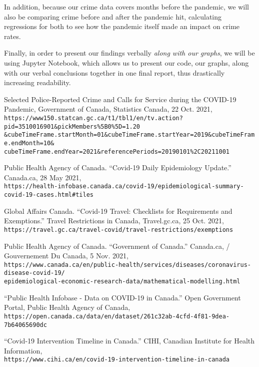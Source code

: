 \documentclass[fontsize=11pt]{article}
\newcommand{\quotes}[1]{``#1''}
\begin{document}
In addition, because our crime data covers months before the pandemic, we will also be comparing crime before and after the pandemic hit, calculating regressions for both to see how the pandemic itself made an impact on crime rates.

Finally, in order to present our findings verbally \emph{along with our graphs}, we will be using Jupyter Notebook, which allows us to present our code, our graphs, along with our verbal conclusions together in one final report, thus drastically increasing readability.

\begin{thebibliography}{9}
	Selected Police-Reported Crime and Calls for Service during the COVID-19 Pandemic, Government of Canada, Statistics Canada, 22 Oct. 2021, \\
	\verb+https://www150.statcan.gc.ca/t1/tbl1/en/tv.action?pid=3510016901&pickMembers%5B0%5D=1.20+\\
	\verb+&cubeTimeFrame.startMonth=01&cubeTimeFrame.startYear=2019&cubeTimeFrame.endMonth=10&+\\
	\verb+cubeTimeFrame.endYear=2021&referencePeriods=20190101%2C20211001+
	
	Public Health Agency of Canada. \quotes{Covid-19 Daily Epidemiology Update.} Canada.ca, 28 May 2021,\\
	\verb+https://health-infobase.canada.ca/covid-19/epidemiological-summary-covid-19-cases.html#tiles+
	
	Global Affairs Canada. \quotes{Covid-19 Travel: Checklists for Requirements and Exemptions.} Travel Restrictions in Canada,  Travel.gc.ca, 25 Oct. 2021,\\
	\verb+https://travel.gc.ca/travel-covid/travel-restrictions/exemptions+
	
	Public Health Agency of Canada. \quotes{Government of Canada.} Canada.ca, / Gouvernement Du Canada, 5 Nov. 2021,\\
	\verb+https://www.canada.ca/en/public-health/services/diseases/coronavirus-disease-covid-19/+\\
	\verb+epidemiological-economic-research-data/mathematical-modelling.html+
	
	\quotes{Public Health Infobase - Data on COVID-19 in Canada.} Open Government Portal, Public Health Agency of Canada,\\
	\verb+https://open.canada.ca/data/en/dataset/261c32ab-4cfd-4f81-9dea-7b64065690dc+
	
	\quotes{Covid-19 Intervention Timeline in Canada.} CIHI, Canadian Institute for Health Information,\\
	\verb+https://www.cihi.ca/en/covid-19-intervention-timeline-in-canada+
	
	
	
\end{thebibliography}
\end{document}
